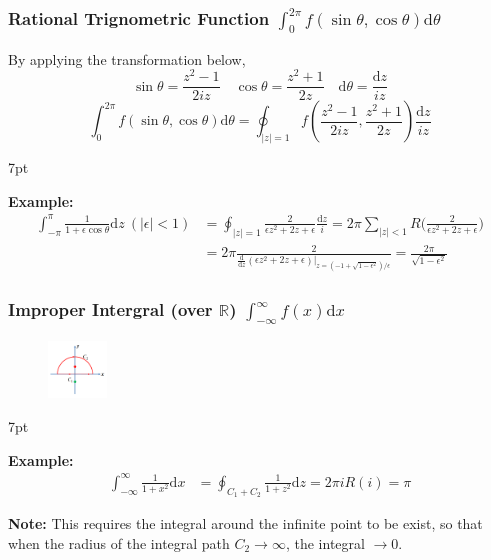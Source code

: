 \documentclass[10pt]{article}
\newcommand{\dd}{\mathrm{d}}
\newenvironment{formal}[2]{%
	\def\FrameCommand{%
		\hspace{1pt}%
		{\color{#1}\vrule width 2pt}%
		{\color{#2}\vrule width 4pt}%
		\colorbox{#2}%
	}%
	\MakeFramed{\advance\hsize-\width\FrameRestore}%
	\noindent\hspace{-4.55pt}%
	\begin{adjustwidth}{}{7pt}%
		\vspace{2pt}\vspace{2pt}%
	}
	{%
		\vspace{2pt}\end{adjustwidth}\endMakeFramed%
}
\begin{document}
\subsubsection[Rational Trignometric Function]{Rational Trignometric Function $\int_{0}^{2\pi} f(\sin \theta, \cos \theta) \dd \theta$}
By applying the transformation below,
$$
\sin \theta = \frac{z^2-1}{2iz} \quad \cos \theta = \frac{z^2+1}{2z} \quad \dd \theta = \frac{\dd z}{iz}
$$
$$
\int_{0}^{2\pi} f(\sin \theta, \cos \theta) \dd \theta = \oint_{|z|=1} f(\frac{z^2-1}{2iz}, \frac{z^2+1}{2z}) \frac{\dd z}{iz}
$$
\begin{formal}{Brown}{brownshade}
	
	\textbf{Example:}
	$$
	\begin{aligned}
		\int_{-\pi}^{\pi} \frac{1}{1+\epsilon \cos \theta} \dd z\ (|\epsilon|<1) &= \oint_{|z|=1} \frac{2}{\epsilon z^2+2z+\epsilon} \frac{\dd z}{i} = 2\pi\sum_{|z|<1} R\bigg(\frac{2}{\epsilon z^2+2z+\epsilon}\bigg)\\
		&= 2\pi \frac{2}{\frac{\dd}{\dd z}(\epsilon z^2+2z+\epsilon) \big|_{z=(-1+\sqrt{1-\epsilon^2})/\epsilon}} = \frac{2\pi}{\sqrt{1-\epsilon^2}}
	\end{aligned}
	$$
	
\end{formal}

\subsubsection[Improper Intergral]{Improper Intergral (over $\mathbb{R}$) $\int_{-\infty}^{\infty} f(x) \dd x$}


\begin{figure}[h]
	\centering
	\includegraphics[width=0.14\textwidth]{img3-4}
\end{figure}
\begin{formal}{Brown}{brownshade}
	
	\textbf{Example:}
	$$
	\begin{aligned}
		\int_{-\infty}^{\infty} \frac{1}{1+x^2} \dd x &= \oint_{C_1+C_2} \frac{1}{1+z^2} \dd z = 2\pi i R(i) = \pi
	\end{aligned}
	$$
	
\textbf{Note:} This requires the integral around the infinite point to be exist, so that when the radius of the integral path $C_2 \rightarrow \infty$, the integral $\rightarrow 0$.

\end{formal}
\end{document}
